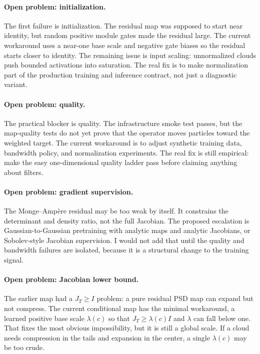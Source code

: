 \paragraph{Open problem: initialization.}
The first failure is initialization. The residual map was supposed to start near identity, but random positive module gates made the residual large. The current workaround uses a near-one base scale and negative gate biases so the residual starts closer to identity. The remaining issue is input scaling: unnormalized clouds push bounded activations into saturation. The real fix is to make normalization part of the production training and inference contract, not just a diagnostic variant.

\paragraph{Open problem: quality.}
The practical blocker is quality. The infrastructure smoke test passes, but the map-quality tests do not yet prove that the operator moves particles toward the weighted target. The current workaround is to adjust synthetic training data, bandwidth policy, and normalization experiments. The real fix is still empirical: make the easy one-dimensional quality ladder pass before claiming anything about filters.

\paragraph{Open problem: gradient supervision.}
The Monge--Amp\`ere residual may be too weak by itself. It constrains the determinant and density ratio, not the full Jacobian. The proposed escalation is Gaussian-to-Gaussian pretraining with analytic maps and analytic Jacobians, or Sobolev-style Jacobian supervision. I would not add that until the quality and bandwidth failures are isolated, because it is a structural change to the training signal.

\paragraph{Open problem: Jacobian lower bound.}
The earlier map had a $J_T\ge I$ problem: a pure residual PSD map can expand but not compress. The current conditional map has the minimal workaround, a learned positive base scale $\lambda(c)$ so that $J_T\ge \lambda(c)I$ and $\lambda$ can fall below one. That fixes the most obvious impossibility, but it is still a global scale. If a cloud needs compression in the tails and expansion in the center, a single $\lambda(c)$ may be too crude.

